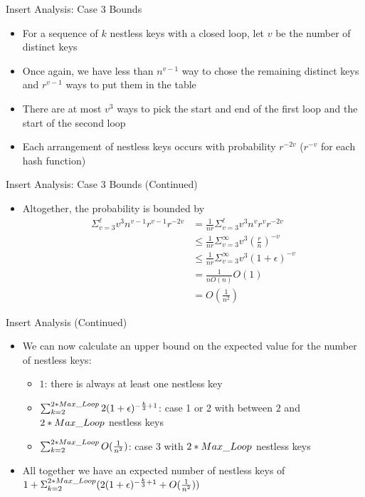 \documentclass[aspectratio=169]{beamer}
\begin{document}
\begin{frame}{Insert Analysis: Case 3 Bounds}
    \begin{itemize}
        \item For a sequence of $k$ nestless keys with a closed loop, let $v$ be the number of distinct keys
        \item Once again, we have less than $n^{v - 1}$ way to chose the remaining distinct keys and $r^{v - 1}$ ways to put them in the table \pause
        \item There are at most $v^3$ ways to pick the start and end of the first loop and the start of the second loop \pause
        \item Each arrangement of nestless keys occurs with probability $r^{-2v}$ ($r^{-v}$ for each hash function)
    \end{itemize}
    \nocite{site:mit}
\end{frame}

\begin{frame}{Insert Analysis: Case 3 Bounds (Continued)}
    \begin{itemize}
        \item Altogether, the probability is bounded by
        \begin{align*}
            \Sigma_{v = 3}^{\ell}v^3 n^{v - 1}r^{v - 1}r^{-2v} &= \frac 1 {nr} \Sigma_{v = 3}^{\ell}v^3 n^{v}r^{v}r^{-2v} \\
            &\le \frac 1 {nr} \Sigma_{v = 3}^{\infty}v^3 (\frac r n)^{-v} \\
            &\le \frac 1 {nr} \Sigma_{v = 3}^{\infty}v^3 (1 + \epsilon)^{-v} \\
            &= \frac 1 {n O(n)} O(1) \\
            &= O(\frac 1 {n^2})
        \end{align*}
    \end{itemize}
\end{frame}

\begin{frame}{Insert Analysis (Continued)}
    \begin{itemize}
        \item We can now calculate an upper bound on the expected value for the number of nestless keys:
        \begin{itemize}
            \item $1$: there is always at least one nestless key \pause
            \item $\sum_{k = 2}^{2 * \emph{Max\_Loop}} 2(1 + \epsilon)^{-\frac k 3 + 1}$: case 1 or 2 with between $2$ and $2 * \emph{Max\_Loop}$ nestless keys \pause
            \item $\sum_{k = 2}^{2 * \emph{Max\_Loop}} O(\frac 1 {n^2})$: case 3 with $2 * \emph{Max\_Loop}$ nestless keys \pause
        \end{itemize}
        \item All together we have an expected number of nestless keys of $1 + \Sigma_{k = 2}^{2 * \emph{Max\_Loop}} (2(1 + \epsilon)^{-\frac k 3 + 1} + O(\frac 1 {n^2}))$
    \end{itemize}
\end{frame}
\end{document}

